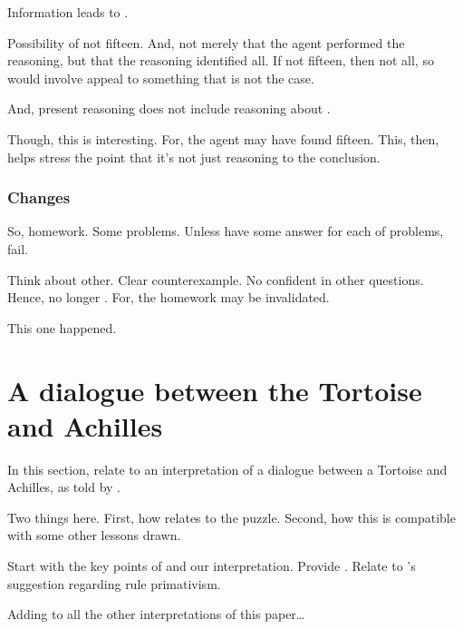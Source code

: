 \begin{note}
  Information leads to \requ{}.

  Possibility of not fifteen.
  And, not merely that the agent performed the reasoning, but that the reasoning identified all.
  If not fifteen, then not all, so would involve appeal to something that is not the case.

  And, present reasoning does not include reasoning about \requ{}.
\end{note}

\begin{note}
  \color{red}
  Though, this is interesting.
  For, the agent may have found fifteen.
  This, then, helps stress the point that it's not just reasoning to the conclusion.
\end{note}

\subsubsection{Changes}
\label{sec:changes}

\begin{note}[Typos]
  So, homework.
  Some problems.
  Unless have some answer for each of problems, fail.

  Think about other.
  Clear counterexample.
  No confident in other questions.
  Hence, no longer \requ{}.
  For, the homework may be invalidated.

  This one happened.
\end{note}


\section[The Tortoise and Achilles]{A dialogue between the Tortoise and Achilles}
\label{cha:zS:sec:question:illu:carroll}

\begin{note}
  In this section, relate \qzS{} to an interpretation of a dialogue between a Tortoise and Achilles, as told by \textcite{Carroll:1895uj}.

  Two things here.
  First, how \qzS{} relates to the puzzle.
  Second, how this is compatible with some other lessons drawn.

  Start with the key points of \textcite{Carroll:1895uj} and our interpretation.
  Provide .
  Relate to \citeauthor{Boghossian:2008vf}'s suggestion regarding rule primativism.
\end{note}

\begin{note}
  \color{red}
  Adding to all the other interpretations of this paper\dots
\end{note}

